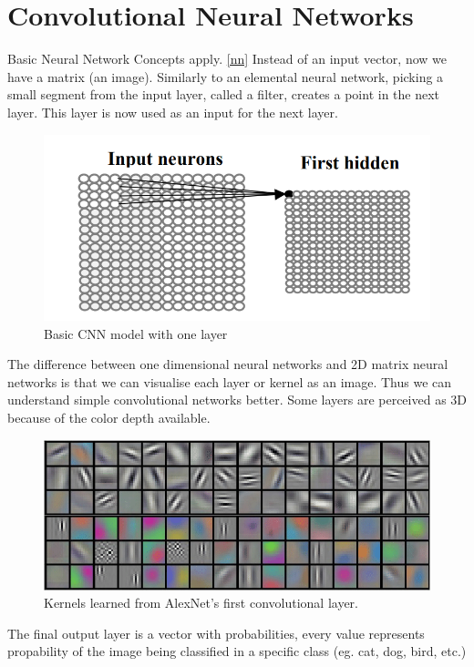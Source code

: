 \section{Convolutional Neural Networks}\label{cnn}
Basic Neural Network Concepts apply. \ref{nn} Instead of an input vector, now we have a matrix (an image). Similarly to an elemental neural network, picking a small segment from the input layer, called a filter, creates a point in the next layer. \cite{8609672} This layer is now used as an input for the next layer.

\begin{figure}[H]
    \centering
    \includegraphics[width=0.5\linewidth]{Images/cnn-layer.png}
    \caption{Basic CNN model with one layer \cite{8609672}}
    \label{fig:collaborative-filtering-diagram}
\end{figure}

The difference between one dimensional neural networks and 2D matrix neural networks is that we can visualise each layer or kernel as an image. Thus we can understand simple convolutional networks better. Some layers are perceived as 3D because of the color depth available.

\begin{figure}[H]
    \centering
    \includegraphics[width=0.5\linewidth]{Images/kernels.png}
    \caption{Kernels learned from AlexNet's first convolutional layer.   \cite{shehata2016using}}
    \label{fig:collaborative-filtering-diagram}
\end{figure}

The final output layer is a vector with probabilities, every value represents propability of the image being classified in a specific class (eg. cat, dog, bird, etc.)

